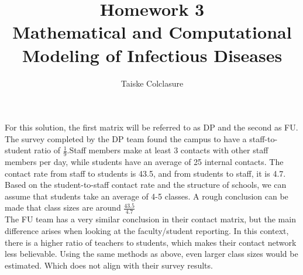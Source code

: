\documentclass{report}
\title{\Huge{Homework 3\\Mathematical and Computational Modeling of Infectious Diseases}}
\author{\huge{Taiske Colclasure}}
\begin{document}
\maketitle
\newpage%
\pagebreak
{}
\begin{sol}
        For this solution, the first matrix will be referred to as DP and the second as FU. The survey completed by the DP team found the campus to have a staff-to-student ratio of $\frac{1}{9}$.Staff members make at least 3 contacts with other staff members per day, while students have an average of 25 internal contacts. The contact rate from staff to students is 43.5, and from students to staff, it is 4.7. Based on the student-to-staff contact rate and the structure of schools, we can assume that students take an average of 4-5 classes. A rough conclusion can be made that class sizes are around $\frac{43.5}{4.7}$\\
       The FU team has a very similar conclusion in their contact matrix, but the main difference arises when looking at the faculty/student reporting. In this context, there is a higher ratio of teachers to students, which makes their contact network less believable. Using the same methods as above, even larger class sizes would be estimated. Which does not align with their survey results.
\end{sol}
\end{document}
